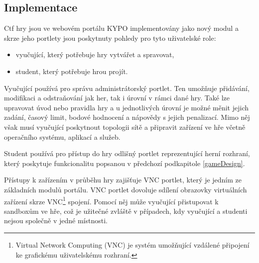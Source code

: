 \documentclass[
  digital, %
  oneside, %
  table,   %
  nolof,     %
  nolot,     %
]{fithesis3}
\begin{document}
\subsection{Implementace}
Ctf hry jsou ve webovém portálu KYPO implementovány jako nový modul a skrze jeho portlety jsou poskytnuty pohledy pro tyto uživatelské role:
\begin{itemize}
  \item vyučující, který potřebuje hry vytvářet a spravovat,
  \item student, který potřebuje hrou projít.
\end{itemize}
Vyučující používá pro správu administrátorský portlet. Ten umožňuje přidávání, modifikaci a odstraňování jak her, tak i úrovní v rámci dané hry. Také lze upravovat úvod nebo pravidla hry a u jednotlivých úrovní je možné měnit jejich zadání, časový limit, bodové hodnocení a nápovědy s jejich penalizací. Mimo něj však musí vyučující poskytnout topologii sítě a připravit zařízení ve hře včetně operačního systému, aplikací a služeb. \cite{ctfDesign, Dankovcikova2015thesis}\par
Student používá pro přístup do hry odlišný portlet reprezentující herní rozhraní, který poskytuje funkcionalitu popsanou v předchozí podkapitole \ref{gameDesign}.\par
Přístupy k zařízením v průběhu hry zajišťuje VNC portlet, který je jedním ze základních modulů portálu. VNC portlet dovoluje sdílení obrazovky virtuálních zařízení skrze VNC\footnote{Virtual Network Computing (VNC) je systém umožňující vzdálené připojení ke grafickému uživatelskému rozhraní.} spojení. Pomocí něj může vyučující přistupovat k sandboxům ve hře, což je užitečné zvláště v případech, kdy vyučující a studenti nejsou společně v jedné místnosti.\cite{ctfDesign}
\end{document}
